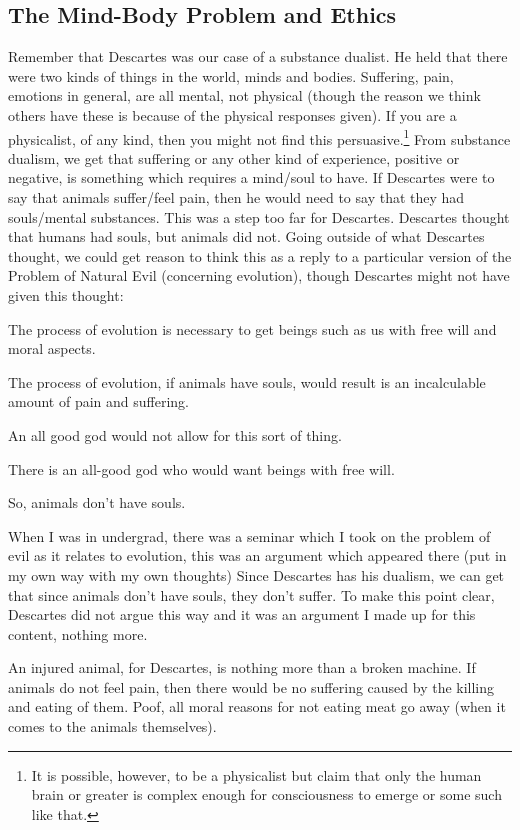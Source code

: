 \subsection{The Mind-Body Problem and Ethics}

Remember that Descartes was our case of a substance dualist. He held that there were two kinds of things in the world, minds and bodies. Suffering, pain, emotions in general, are all mental, not physical (though the reason we think others have these is because of the physical responses given). If you are a physicalist, of any kind, then you might not find this persuasive.\footnote{ It is possible, however, to be a physicalist but claim that only the human brain or greater is complex enough for consciousness to emerge or some such like that.} From substance dualism, we get that suffering or any other kind of experience, positive or negative, is something which requires a mind/soul to have.  If Descartes were to say that animals suffer/feel pain, then he would need to say that they had souls/mental substances. This was a step too far for Descartes. Descartes thought that humans had souls, but animals did not. Going outside of what Descartes thought, we could get reason to think this as a reply to a particular version of the Problem of Natural Evil (concerning evolution), though Descartes might not have given this thought:
\begin{earg}
    \item[1] The process of evolution is necessary to get beings such as us with free will and moral aspects.
    \item[2] The process of evolution, if animals have souls, would result is an incalculable amount of pain and suffering.
    \item[3] An all good god would not allow for this sort of thing.
    \item[4] There is an all-good god who would want beings with free will.
    \item[5] So, animals don't have souls. 
\end{earg}
When I was in undergrad, there was a seminar which I took on the problem of evil as it relates to evolution, this was an argument which appeared there (put in my own way with my own thoughts) Since Descartes has his dualism, we can get that since animals don't have souls, they don't suffer. To make this point clear, Descartes did not argue this way and it was an argument I made up for this content, nothing more.

An injured animal, for Descartes, is nothing more than a broken machine. If animals do not feel pain, then there would be no suffering caused by the killing and eating of them. Poof, all moral reasons for not eating meat go away (when it comes to the animals themselves).  

